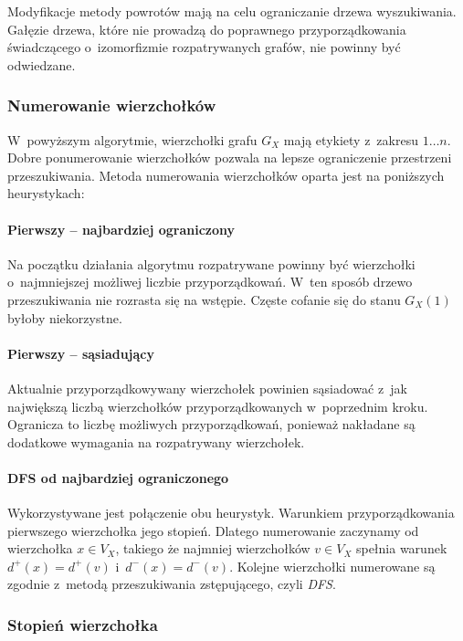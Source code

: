 \documentclass[12pt, a4paper, ]{article} %
\begin{document}
Modyfikacje metody powrotów mają na celu ograniczanie drzewa wyszukiwania.
Gałęzie drzewa, które nie prowadzą do poprawnego przyporządkowania świadczącego
o~izomorfizmie rozpatrywanych grafów, nie powinny być odwiedzane.

\subsubsection{Numerowanie wierzchołków}

W~powyższym algorytmie, wierzchołki grafu $G_X$ mają etykiety z~zakresu ${1
\ldots n}$. Dobre ponumerowanie wierzchołków pozwala na lepsze ograniczenie
przestrzeni przeszukiwania. Metoda numerowania wierzchołków oparta jest na
poniższych heurystykach:

\paragraph{Pierwszy -- najbardziej ograniczony}\mbox{}

Na początku działania algorytmu rozpatrywane powinny być wierzchołki
o~najmniejszej możliwej liczbie przyporządkowań. W~ten sposób drzewo
przeszukiwania nie rozrasta się na wstępie. Częste cofanie się do stanu
$G_X(1)$ byłoby niekorzystne.

\paragraph{Pierwszy -- sąsiadujący}\mbox{}

Aktualnie przyporządkowywany wierzchołek powinien sąsiadować z~jak największą
liczbą wierzchołków przyporządkowanych w~poprzednim kroku. Ogranicza to liczbę
możliwych przyporządkowań, ponieważ nakładane są dodatkowe wymagania na
rozpatrywany wierzchołek.


\paragraph{DFS od najbardziej ograniczonego}\mbox{}

Wykorzystywane jest połączenie obu heurystyk. Warunkiem przyporządkowania
pierwszego wierzchołka jego stopień. Dlatego numerowanie zaczynamy od
wierzchołka $x \in V_X$, takiego że najmniej wierzchołków $v \in V_X$ spełnia
warunek $d^+(x)=d^+(v)$ i~$d^-(x)=d^-(v)$. Kolejne wierzchołki numerowane są
zgodnie z~metodą przeszukiwania zstępującego, czyli \textit{DFS}.

\subsubsection{Stopień wierzchołka}
\end{document}
